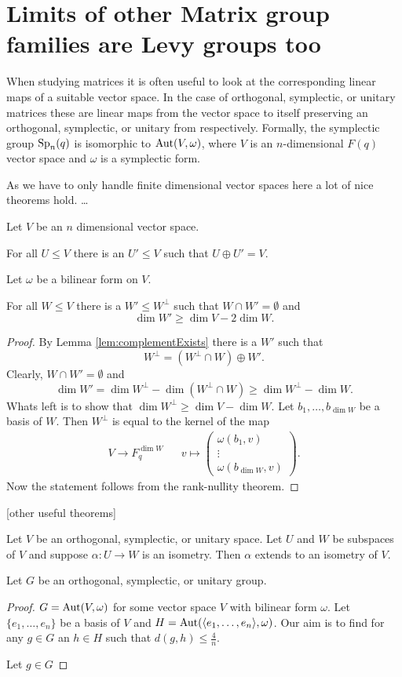 \section{Limits of other Matrix group families are Levy groups too}
When studying matrices it is often useful to look at the corresponding linear maps of a suitable vector space. In the case of orthogonal, symplectic, or unitary matrices these are linear maps from the vector space to itself preserving an orthogonal, symplectic, or unitary from respectively. Formally, the symplectic group $\operatorname{Sp}_n(q)$ is isomorphic to $\operatorname{Aut}(V,\omega)$, where $V$ is an $n$-dimensional $F(q)$ vector space and $\omega$ is a symplectic form.

As we have to only handle finite dimensional vector spaces here a lot of nice theorems hold. \dots

Let $V$ be an $n$ dimensional vector space.%
\begin{lemma}\label{lem:complementExists}
For all $U\leq V$ there is an $U'\leq V$ such that $U\oplus U'=V$.
\end{lemma}

Let $\omega$ be a bilinear form on $V$.
\begin{lemma}
For all $W\leq V$ there is a $W'\leq W^\bot$ such that $W\cap W'=\emptyset$ and \[\dim W'\geq \dim V-2\dim W.\]
\end{lemma}
\begin{proof}
By Lemma \ref{lem:complementExists} there is a $W'$ such that 
\[W^\bot=(W^\bot\cap W)\oplus W'.\]
Clearly, $W\cap W'=\emptyset$ and 
\[\dim W'=\dim W^\bot - \dim (W^\bot\cap W)\geq \dim W^\bot- \dim W.\]
Whats left is to show that $\dim W^\bot\geq \dim V-\dim W$. Let $b_1,\dots, b_{\dim W}$ be a basis of $W$. Then $W^\bot$ is equal to the kernel of the map 
\begin{align*}
V\to F_q^{\dim W}&& v\mapsto
\begin{pmatrix}
\omega(b_1,v)\\
\vdots\\
\omega(b_{\dim W},v)
\end{pmatrix}.
\end{align*}
Now the statement follows from the rank-nullity theorem.
\end{proof}

[other useful theorems]


\begin{theorem}[Witt]
Let $V$ be an orthogonal, symplectic, or unitary space. Let $U$ and $W$ be subspaces of $V$ and suppose $\alpha\colon U\to W$ is an isometry. Then $\alpha$ extends to an isometry of $V$.
\end{theorem}

\begin{lemma}
Let $G$ be an orthogonal, symplectic, or unitary group. 
\end{lemma}
\begin{proof}
$G=\operatorname{Aut}(V,\omega)$ for some vector space $V$ with  bilinear form $\omega$. Let $\{e_1,\dots,e_n\}$ be a basis of $V$ and $H=\operatorname{Aut}(\langle e_1,\dots,e_n\rangle,\omega)$. Our aim is to find for any $g\in G$ an $h\in H$ such that $d(g,h)\leq\frac{4}{n}$.

Let $g\in G$ 
\end{proof}